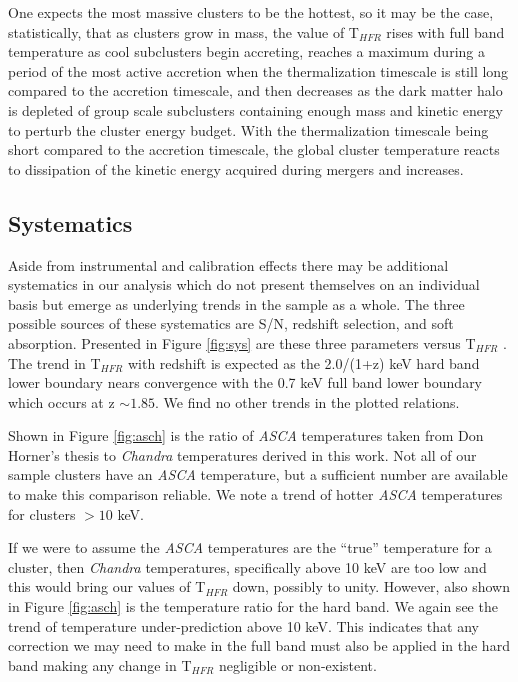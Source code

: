 \documentclass{emulateapj}
\newcommand{\tf}{T$_{HFR}$ }
\begin{document}
One expects the most massive clusters to be the hottest, so it may be
the case, statistically, that as clusters grow in mass, the value of
\tf rises with full band temperature as cool subclusters begin
accreting, reaches a maximum during a period of the most active
accretion when the thermalization timescale is still long compared to
the accretion timescale, and then decreases as the dark matter halo is
depleted of group scale subclusters containing enough mass and kinetic
energy to perturb the cluster energy budget. With the thermalization
timescale being short compared to the accretion timescale, the global
cluster temperature reacts to dissipation of the kinetic energy
acquired during mergers and increases.

\subsection{Systematics} \label{sec:sys}

Aside from instrumental and calibration effects there may be
additional systematics in our analysis which do not present themselves
on an individual basis but emerge as underlying trends in the sample
as a whole. The three possible sources of these systematics
are S/N, redshift selection, and soft absorption. Presented in Figure
\ref{fig:sys} are these three parameters versus \tf. The trend in \tf
with redshift is expected as the 2.0/(1+z) keV hard band lower
boundary nears convergence with the 0.7 keV full band lower boundary which
occurs at z $\sim 1.85$. We find no other trends in the plotted relations.

Shown in Figure \ref{fig:asch} is the ratio of {\textit{ASCA}}
temperatures taken from Don Horner's thesis to {\textit{Chandra}}
temperatures derived in this work. Not all of our sample clusters have
an {\textit{ASCA}} temperature, but a sufficient number are available
to make this comparison reliable. We note a trend of hotter
{\textit{ASCA}} temperatures for clusters $> 10$ keV.

If we were to assume the {\textit{ASCA}} temperatures are
the ``true'' temperature for a cluster, then {\textit{Chandra}} temperatures,
specifically above 10 keV are too low and this would bring our values
of \tf down, possibly to unity. However, also shown in
Figure \ref{fig:asch} is the temperature ratio for the hard band. We
again see the trend of temperature under-prediction above 10 keV. This
indicates that any correction we may need to make in the full band
must also be applied in the hard band making any change in \tf
negligible or non-existent.
\end{document}
